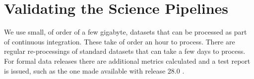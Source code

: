 \section{Validating the Science Pipelines}
\label{sec:validation}

We use small, of order of a few gigabyte, datasets that can be processed as part of continuous integration.
These take of order an hour to process.
There are regular re-processings of standard datasets that can take a few days to process.
For formal data releases there are additional metrics calculated and a test report is issued, such as the one made available with release 28.0 \citep{DMTR-451}.


